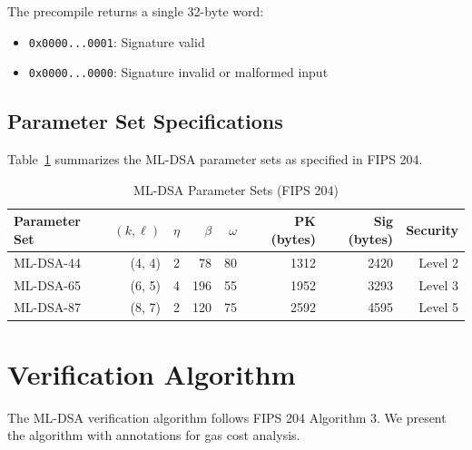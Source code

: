 \documentclass[11pt,a4paper]{article}
\begin{document}
The precompile returns a single 32-byte word:
\begin{itemize}
    \item \texttt{0x0000...0001}: Signature valid
    \item \texttt{0x0000...0000}: Signature invalid or malformed input
\end{itemize}

\subsection{Parameter Set Specifications}

Table~\ref{tab:params} summarizes the ML-DSA parameter sets as specified in FIPS 204.

\begin{table}[htbp]
\centering
\caption{ML-DSA Parameter Sets (FIPS 204)}
\label{tab:params}
\begin{tabular}{@{}lrrrrrrr@{}}
\toprule
Parameter Set & $(k, \ell)$ & $\eta$ & $\beta$ & $\omega$ & PK (bytes) & Sig (bytes) & Security \\
\midrule
ML-DSA-44 & (4, 4) & 2 & 78 & 80 & 1312 & 2420 & Level 2 \\
ML-DSA-65 & (6, 5) & 4 & 196 & 55 & 1952 & 3293 & Level 3 \\
ML-DSA-87 & (8, 7) & 2 & 120 & 75 & 2592 & 4595 & Level 5 \\
\bottomrule
\end{tabular}
\end{table}

\section{Verification Algorithm}

The ML-DSA verification algorithm follows FIPS 204 Algorithm 3. We present the algorithm with annotations for gas cost analysis.
\end{document}
